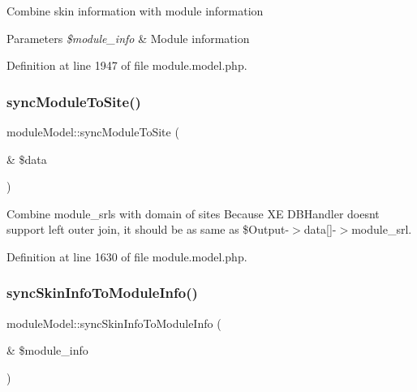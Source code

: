 Combine skin information with module information 
\begin{DoxyParams}{Parameters}
{\em \$module\+\_\+info} & Module information \\
\hline
\end{DoxyParams}


Definition at line 1947 of file module.\+model.\+php.

\mbox{\label{classmoduleModel_ab51d556817682d653b92e09a34b138d6}} 
\subsubsection{\texorpdfstring{sync\+Module\+To\+Site()}{syncModuleToSite()}}
{\footnotesize\ttfamily module\+Model\+::sync\+Module\+To\+Site (\begin{DoxyParamCaption}\item[{\&}]{\$data }\end{DoxyParamCaption})}



Combine module\+\_\+srls with domain of sites Because XE D\+B\+Handler doesn\textquotesingle{}t support left outer join, it should be as same as \$\+Output-\/$>$data\mbox{[}\mbox{]}-\/$>$module\+\_\+srl. 



Definition at line 1630 of file module.\+model.\+php.

\mbox{\label{classmoduleModel_af9179765de4796b45236b62be16eb8fb}} 
\subsubsection{\texorpdfstring{sync\+Skin\+Info\+To\+Module\+Info()}{syncSkinInfoToModuleInfo()}}
{\footnotesize\ttfamily module\+Model\+::sync\+Skin\+Info\+To\+Module\+Info (\begin{DoxyParamCaption}\item[{\&}]{\$module\+\_\+info }\end{DoxyParamCaption})}



